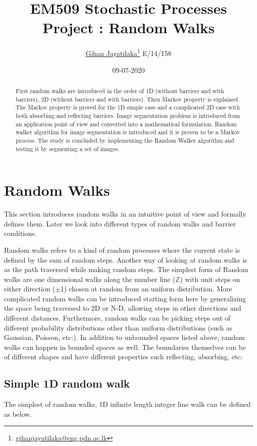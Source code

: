 \documentclass[a4paper]{article}
\title{EM509 Stochastic Processes Project : Random Walks}
\author{\href{https://gihan.me}{Gihan Jayatilaka}\footnote{\href{mailto:gihanjayatilaka@eng.pdn.ac.lk}{gihanjayatilaka@eng.pdn.ac.lk}} \hspace{1cm} E/14/158}
\date{09-07-2020} %
\begin{document}
\nocite{*}
\maketitle
\begin{abstract}
    First random walks are introduced in the order of 1D (without barriers and with barriers), 2D (without barriers and with barriers). Then Markov property is explained. The Markov property is proved for the 1D simple case and a complicated 2D case with both absorbing and reflecting barriers. Image segmentation problem is introduced from an application point of view and converted into a mathematical formulation. Random walker algorithm for image segmentation is introduced and it is proven to be a Markov process. The study is concluded by implementing the Random Walker algorithm and testing it by segmenting a set of images.
\end{abstract}

\tableofcontents


\section{Random Walks}
This section introduces random walks in an intuitive point of view and formally defines them. Later we look into different types of random walks and barrier conditions. 


Random walks refers to a kind of random processes where the current state is defined by the sum of random steps. Another way of looking at random walks is as the path traversed while making random steps.
The simplest form of Random walks are one dimensional walks along the number line ($\mathbb{Z}$) with unit steps on either direction ($\pm1$) chosen at random from an uniform distribution. More complicated random walks can be introduced starting form here by generalizing the space being traversed to 2D or N-D, allowing steps in other directions and  different distances. Furthermore, random walks can be picking steps out of different probability distributions other than uniform distributions (such as Gaussian, Poisson, etc:).
In addition to unbounded spaces listed above, random walks can happen in bounded spaces as well. The boundaries themselves can be of different shapes and have different properties such reflecting, absorbing, etc:

\subsection{Simple 1D random walk}
The simplest of random walks, 1D infinite length integer line walk can be defined as below.
\end{document}
